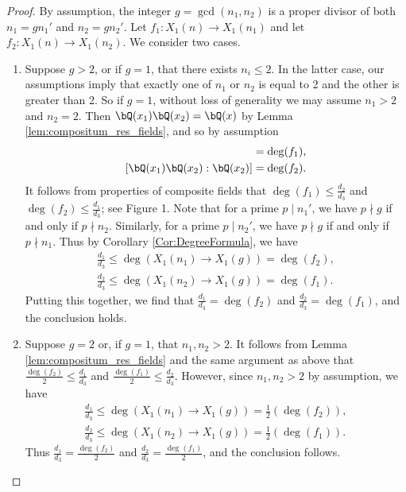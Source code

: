 \documentclass[11pt,reqno]{amsart}
\theoremstyle{plain}
\theoremstyle{definition}
\newcommand{\Q}{\bQ}
\newcommand{\abedit}[1]{{\color{blue} #1}}
\begin{document}
    \begin{proof}  By assumption, the integer $g=\gcd(n_1,n_2)$ is a proper divisor of both $n_1=gn_1'$ and $n_2=gn_2'$. Let $f_1: X_1(n) \rightarrow X_1(n_1)$ and let $f_2: X_1(n) \rightarrow X_1(n_2)$. We consider two cases.
    \begin{enumerate}
    \item Suppose $ g>2$, \abedit{or if $g=1$, that there exists $n_i \leq 2$. In the latter case, our assumptions imply that exactly one of $n_1$ or $n_2$ is equal to 2 and the other is greater than 2. So if $g=1$,} without loss of generality we may assume $n_1>2$ and $n_2=2$. Then $\Q(x_1)\Q(x_2)=\Q(x)$ by Lemma \ref{lem:compositum_res_fields}, and so by assumption
    \begin{align*}
    [\Q(x_1)\Q(x_2):\Q(x_1)]=\deg(f_1),\\
    [\Q(x_1)\Q(x_2):\Q(x_2)]=\deg(f_2).
    \end{align*}
        It follows from properties of composite fields that $\deg(f_1) \leq \frac{d_2}{d_3}$ and $\deg(f_2) \leq \frac{d_1}{d_3}$; see Figure 1. Note that for a prime $p \mid n_1'$, we have $p \nmid g$ if and only if $p \nmid n_2$. Similarly, for a prime $p \mid n_2'$, we have $p \nmid g$ if and only if $p \nmid n_1$. Thus by Corollary \ref{Cor:DegreeFormula}, we have
    \begin{align*}
    \frac{d_1}{d_3} \leq \deg(X_1(n_1) \rightarrow X_1(g))=\deg(f_2),\\
        \frac{d_2}{d_3} \leq \deg(X_1(n_2) \rightarrow X_1(g))=\deg(f_1).
    \end{align*}
    Putting this together, we find that $\frac{d_1}{d_3}=\deg(f_2)$ and $\frac{d_2}{d_3}=\deg(f_1)$, and the conclusion holds.
    \item Suppose $g=2$ or, if $g=1$, that $n_1,n_2>2$. It follows from Lemma \ref{lem:compositum_res_fields} and the same argument as above that $\frac{\deg(f_2)}{2} \leq \frac{d_1}{d_3}$ and $\frac{\deg(f_1)}{2} \leq \frac{d_2}{d_3}$. However, since $n_1,n_2>2$ by assumption, we have
    \begin{align*}
    \frac{d_1}{d_3} \leq \deg(X_1(n_1) \rightarrow X_1(g))=\frac{1}{2}(\deg(f_2)),\\
       \frac{ d_2}{d_3} \leq \deg(X_1(n_2) \rightarrow X_1(g))=\frac{1}{2}(\deg(f_1)).
    \end{align*}
   Thus $\frac{d_1}{d_3}=\frac{\deg(f_2)}{2}$ and $\frac{d_2}{d_3}=\frac{\deg(f_1)}{2}$, and the conclusion follows. \qedhere
      \end{enumerate}
    \end{proof}
\end{document}
